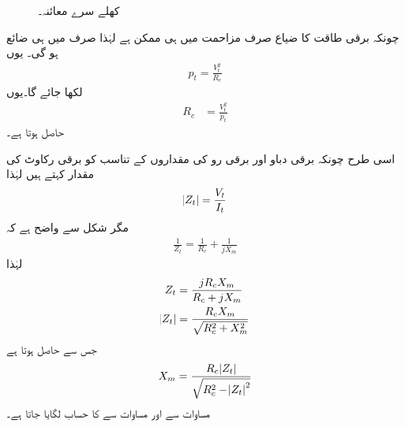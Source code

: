 \begin{figure}
\centering
\caption{کھلے سرے معائنہ۔}
\label{شکل_ٹرانسفارمر_کھلے_سرے_معائنہ}
\end{figure}

چونکہ برقی طاقت کا ضیاع صرف مزاحمت میں ہی ممکن ہے لہٰذا  صرف    میں ہی ضائع ہو گی۔ یوں
\begin{align*}
p_t=\frac{V_t^2}{R_c}
\end{align*}
لکھا جائے گا۔یوں
\begin{align}\label{مساوات_ٹرانسفارمر_کھلے_دور_مزاحمت_حاصل}
R_c&=\frac{V_t^2}{p_t}
\end{align}
حاصل ہوتا ہے۔

اسی طرح چونکہ برقی دباو اور برقی رو کی مقداروں کے تناسب کو برقی رکاوٹ کی مقدار کہتے ہیں لہٰذا
\begin{align*}
\abs{Z_t}=\frac{V_t}{I_t}
\end{align*}
مگر شکل   سے واضح ہے کہ
\begin{align*}
\frac{1}{Z_t}=\frac{1}{R_c}+\frac{1}{j X_m}
\end{align*}
لہٰذا
\begin{align*}
Z_t&=\frac{j R_c X_m}{R_c+j X_m}\\
\abs{Z_t}&=\frac{R_c X_m}{\sqrt{R_c^2+X_m^2}}
\end{align*}
جس سے حاصل ہوتا ہے
\begin{align}\label{مساوات_ٹرانسفارمر_کھلے_دور_امالہ_حاصل}
X_m=\frac{R_c \abs{Z_t}}{\sqrt{R_c^2-\abs{Z_t}^2}}
\end{align}
مساوات   سے  اور  مساوات   سے    کا حساب لگایا جاتا ہے۔


